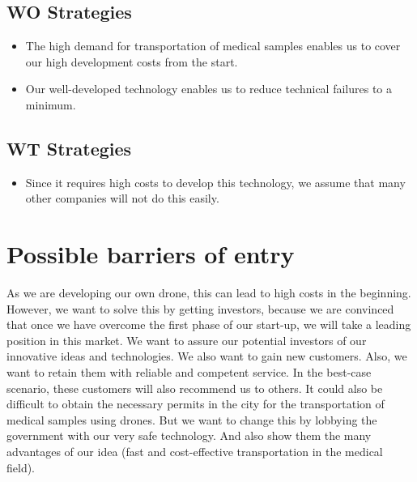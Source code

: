\subsection{WO Strategies}
\begin{itemize}
  \item The high demand for transportation of medical samples enables us to cover our high development costs from the start.
  \item Our well-developed technology enables us to reduce technical failures to a minimum.
\end{itemize}
\subsection{WT Strategies}
\begin{itemize}
  \item Since it requires high costs to develop this technology, we assume that many other companies will not do this easily.
\end{itemize}
\section{Possible barriers of entry}
As we are developing our own drone, this can lead to high costs in the beginning. However, we want to solve this by getting investors, because we are convinced that once we have overcome the first phase of our start-up, we will take a leading position in this market. We want to assure our potential investors of our innovative ideas and technologies. We also want to gain new customers. Also, we want to retain them with reliable and competent service. In the best-case scenario, these customers will also recommend us to others.
\newline
It could also be difficult to obtain the necessary permits in the city for the transportation of medical samples using drones. But we want to change this by lobbying the government with our very safe technology. And also show them the many advantages of our idea (fast and cost-effective transportation in the medical field).
